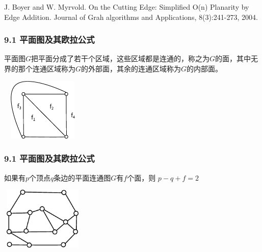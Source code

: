 \documentclass{beamer}
\begin{document}
\begin{CJK}{UTF8}{gbsn}
\begin{frame}
\pause
  \begin{thebibliography}{99}
  J. Boyer and W. Myrvold.
\newblock On the Cutting Edge: Simplified O(n) Planarity by Edge Addition.
\newblock Journal of Grah algorithms and Applications, 8(3):241-273, 2004.
  \end{thebibliography}
\end{frame}
\begin{frame}
  \frametitle{9.1 平面图及其欧拉公式}
  \begin{definition9.1.2}
    平面图$G$把平面分成了若干个区域，这些区域都是连通的，称之为$G$的面，其中无界的那个连通区域称为$G$的外部面，其余的连通区域称为$G$的内部面。
    
\includegraphics[width=4cm,height=3cm]{face}
  \end{definition9.1.2}
\end{frame}
\begin{frame}
  \frametitle{9.1 平面图及其欧拉公式}
  \begin{theorem9.1.1}
    如果有$p$个顶点$q$条边的平面连通图$G$有$f$个面，则
      $p - q + f = 2$
  \end{theorem9.1.1}
\vspace{1cm}
\centering
    \includegraphics[width=4cm,height=3cm]{euler}
\end{frame}


\end{CJK}
\end{document}
